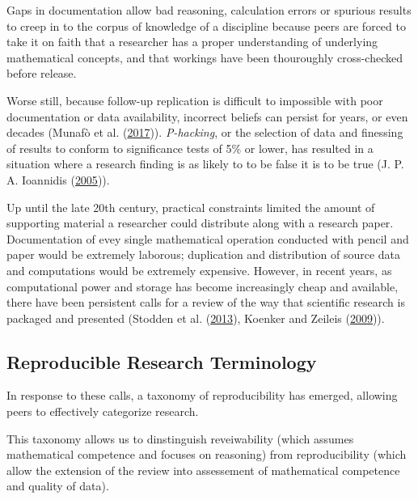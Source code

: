 \documentclass[11pt,preprint, authoryear]{elsarticle}
\numberwithin{equation}{section}
\numberwithin{figure}{section}
\numberwithin{table}{section}
\begin{document}
Gaps in documentation allow bad reasoning, calculation errors or
spurious results to creep in to the corpus of knowledge of a discipline
because peers are forced to take it on faith that a researcher has a
proper understanding of underlying mathematical concepts, and that
workings have been thouroughly cross-checked before release.

Worse still, because follow-up replication is difficult to impossible
with poor documentation or data availability, incorrect beliefs can
persist for years, or even decades (Munafò et al.
(\protect\hyperlink{ref-Munafo2017}{2017})). \emph{P-hacking}, or the
selection of data and finessing of results to conform to significance
tests of 5\% or lower, has resulted in a situation where a research
finding is as likely to to be false it is to be true (J. P. A. Ioannidis
(\protect\hyperlink{ref-Ioannidis2005}{2005})).

Up until the late 20th century, practical constraints limited the amount
of supporting material a researcher could distribute along with a
research paper. Documentation of evey single mathematical operation
conducted with pencil and paper would be extremely laborous; duplication
and distribution of source data and computations would be extremely
expensive. However, in recent years, as computational power and storage
has become increasingly cheap and available, there have been persistent
calls for a review of the way that scientific research is packaged and
presented (Stodden et al. (\protect\hyperlink{ref-Stodden2013}{2013}),
Koenker and Zeileis (\protect\hyperlink{ref-Koenker2009}{2009})).

\subsection{Reproducible Research
Terminology}\label{reproducible-research-terminology}

In response to these calls, a taxonomy of reproducibility has emerged,
allowing peers to effectively categorize research.

This taxonomy allows us to dinstinguish reveiwability (which assumes
mathematical competence and focuses on reasoning) from reproducibility
(which allow the extension of the review into assessement of
mathematical competence and quality of data).
\end{document}
